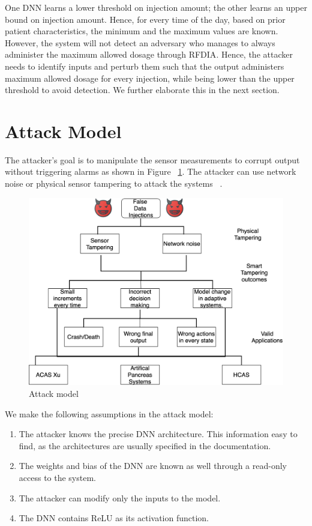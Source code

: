One \ac{DNN} learns a lower threshold on injection amount; the other learns an upper bound on injection amount. 
Hence, for every time of the day, based on prior patient characteristics, the minimum and the maximum values are known. 
However, the system will not detect  an adversary  who manages to always administer the maximum allowed dosage through \ac{RFDIA}. 
Hence, the attacker needs to identify inputs and  perturb them  such that the output administers maximum allowed dosage for every injection,
  while being lower than the upper threshold to avoid detection. 
  We further elaborate this in the next section. 


\section{Attack Model}
The attacker's goal is to manipulate the sensor measurements to corrupt output without triggering alarms as shown in Figure ~\ref{fig:attackmodelphysical}. 
The attacker can use network noise or physical sensor tampering to attack the systems ~\cite{10.1145/3319535.3339815}.
 
\begin{figure}
	\centering
	\includegraphics[width=0.7\linewidth]{Images/Attackmodelphysical}
	\caption{Attack model}
	\label{fig:attackmodelphysical}
\end{figure}

We make the following assumptions in the attack model:
\begin{enumerate}
	\item The attacker knows the precise \ac{DNN}  architecture. This information easy to find, as the architectures are  usually specified in the  documentation. 
	\item  The weights and bias of the \ac{DNN}  are known as well through a read-only access to the system.  
	\item The attacker can modify only the inputs to the model.
	\item The \ac{DNN} contains ReLU as its activation function. 
\end{enumerate}


